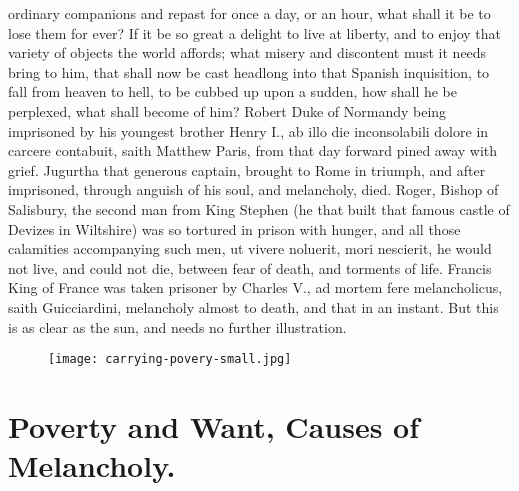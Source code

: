{{ordinary companions and repast for once a day, or an hour, what shall
it be to lose them for ever? If it be so great a delight to live at
liberty, and to enjoy that variety of objects the world affords; what
misery and discontent must it needs bring to him, that shall now be
cast headlong into that Spanish inquisition, to fall from heaven to
hell, to be cubbed up upon a sudden, how shall he be perplexed, what
shall become of him? Robert Duke of Normandy being imprisoned by
his youngest brother Henry I., ab illo die inconsolabili dolore in
carcere contabuit, saith Matthew Paris, from that day forward pined
away with grief. Jugurtha that generous captain, brought to Rome
in triumph, and after imprisoned, through anguish of his soul, and
melancholy, died. Roger, Bishop of Salisbury, the second man from
King Stephen (he that built that famous castle of Devizes in
Wiltshire) was so tortured in prison with hunger, and all those
calamities accompanying such men, ut vivere noluerit, mori
nescierit, he would not live, and could not die, between fear of death,
and torments of life. Francis King of France was taken prisoner by
Charles V., ad mortem fere melancholicus, saith Guicciardini,
melancholy almost to death, and that in an instant. But this is as
clear as the sun, and needs no further illustration.

\cleartoleftpage{}
\begin{figure}[p]
  \begingroup
  \centering
  \texttt{[image: carrying-povery-small.jpg]}
  \label{fig:povertyriches}
\end{figure}

\clearpage{}
\thispagestyle{titleontop}
\section{Poverty and Want, Causes of Melancholy.}\label{sec:poverty-and-want}

}}
